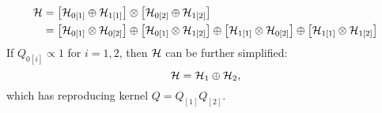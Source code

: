 \begin{align} 
\begin{split} \label{eq:tensor-sum-decomposition}
\mathcal{H} &= \left[\mathcal{H}_{0\left[1\right]} \oplus \mathcal{H}_{1\left[1\right]} \right] \otimes \left[\mathcal{H}_{0\left[2\right]} \oplus \mathcal{H}_{1\left[2\right]} \right] \\
&= \left[\mathcal{H}_{0\left[1\right]} \otimes  \mathcal{H}_{0\left[2\right]}\right] \oplus \left[\mathcal{H}_{0\left[1\right]} \otimes \mathcal{H}_{1\left[2\right]}\right] \oplus \left[\mathcal{H}_{1\left[1\right]} \otimes  \mathcal{H}_{0\left[2\right]}\right] \oplus \left[\mathcal{H}_{1\left[1\right]} \otimes  \mathcal{H}_{1\left[2\right]}\right] 
\end{split}
\end{align}
\noindent
If $Q_{0\left[i\right]} \propto 1$ for $i = 1,2$, then $\mathcal{H}$ can be further simplified:
\begin{equation}
\mathcal{H} = \mathcal{H}_1 \oplus \mathcal{H}_2,
\end{equation}
\noindent
which has reproducing kernel $Q = Q_{\left[1\right]}Q_{\left[2\right]}$.

